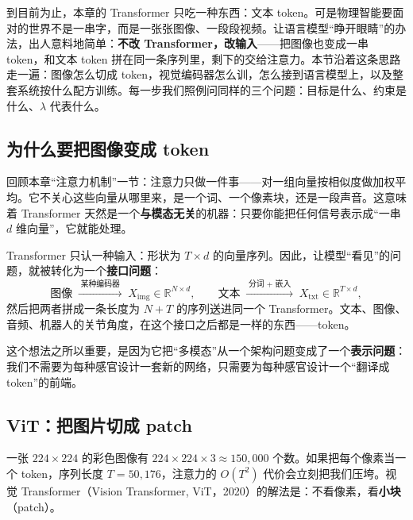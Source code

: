 到目前为止，本章的 Transformer 只吃一种东西：文本 token。可是物理智能要面对的世界不是一串字，而是一张张图像、一段段视频。让语言模型“睁开眼睛”的办法，出人意料地简单：\textbf{不改 Transformer，改输入}——把图像也变成一串 token，和文本 token 拼在同一条序列里，剩下的交给注意力。本节沿着这条思路走一遍：图像怎么切成 token，视觉编码器怎么训，怎么接到语言模型上，以及整套系统按什么配方训练。每一步我们照例问同样的三个问题：目标是什么、约束是什么、$\lambda$ 代表什么。

\subsection{为什么要把图像变成 token}

回顾本章“注意力机制”一节：注意力只做一件事——对一组向量按相似度做加权平均。它不关心这些向量从哪里来，是一个词、一个像素块，还是一段声音。这意味着 Transformer 天然是一个\textbf{与模态无关}的机器：只要你能把任何信号表示成“一串 $d$ 维向量”，它就能处理。

\begin{keyidea}[感知的统一接口]
Transformer 只认一种输入：形状为 $T \times d$ 的向量序列。因此，让模型“看见”的问题，就被转化为一个\textbf{接口问题}：
\begin{equation}
    \text{图像} \;\xrightarrow{\;\text{某种编码器}\;}\; X_{\text{img}} \in \mathbb{R}^{N \times d}, \qquad
    \text{文本} \;\xrightarrow{\;\text{分词 + 嵌入}\;}\; X_{\text{txt}} \in \mathbb{R}^{T \times d},
\end{equation}
然后把两者拼成一条长度为 $N + T$ 的序列送进同一个 Transformer。文本、图像、音频、机器人的关节角度，在这个接口之后都是一样的东西——token。
\end{keyidea}

这个想法之所以重要，是因为它把“多模态”从一个架构问题变成了一个\textbf{表示问题}：我们不需要为每种感官设计一套新的网络，只需要为每种感官设计一个“翻译成 token”的前端。

\subsection{ViT：把图片切成 patch}

一张 $224 \times 224$ 的彩色图像有 $224 \times 224 \times 3 \approx 150{,}000$ 个数。如果把每个像素当一个 token，序列长度 $T = 50{,}176$，注意力的 $O(T^2)$ 代价会立刻把我们压垮。视觉 Transformer（Vision Transformer, ViT，2020）的解法是：不看像素，看\textbf{小块}（patch）。

